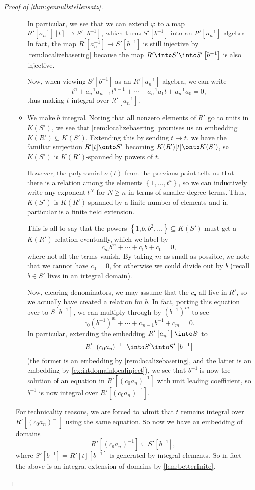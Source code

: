 \begin{proof}[Proof of \autoref{thm:gennullstellensatz}]
\begin{enumerate}[label=(\roman*)]
\begin{itemize}
			In particular, we see that we can extend $\varphi$ to a map $R'\left[a_n^{-1}\right][t]\to S'\left[b^{-1}\right]$, which turns $S'\left[b^{-1}\right]$ into an $R'\left[a_n^{-1}\right]$-algebra. In fact, the map $R'\left[a_n^{-1}\right]\to S'\left[b^{-1}\right]$ is still injective by \autoref{rem:localizebasering} because the map $R'\into S'\into S'\left[b^{-1}\right]$ is also injective.
			
			Now, when viewing $S'\left[b^{-1}\right]$ as an $R'\left[a_n^{-1}\right]$-algebra, we can write
			\[t^n+a_n^{-1}a_{n-1}t^{n-1}+\cdots+a_n^{-1}a_1t+a_n^{-1}a_0=0,\]
			thus making $t$ integral over $R'\left[a_n^{-1}\right]$.

			\item We make $b$ integral. Noting that all nonzero elements of $R'$ go to units in $K(S')$, we see that \autoref{rem:localizebasering} promises us an embedding $K(R')\subseteq K(S')$. Extending this by sending $t\mapsto t$, we have the familiar surjection $R'[t]\onto S'$ becoming $K(R')[t]\onto K(S')$, so $K(S')$ is $K(R')$-spanned by powers of $t$.
			
			However, the polynomial $a(t)$ from the previous point tells us that there is a relation among the elements $\left\{1,\ldots,t^n\right\}$, so we can inductively write any exponent $t^N$ for $N\ge n$ in terms of smaller-degree terms. Thus, $K(S')$ is $K(R')$-spanned by a finite number of elements and in particular is a finite field extension.

			This is all to say that the powers $\left\{1,b,b^2,\ldots\right\}\subseteq K(S')$ must get a $K(R')$-relation eventually, which we label by
			\[c_mb^m+\cdots+c_1b+c_0=0,\]
			where not all the terms vanish. By taking $m$ as small as possible, we note that we cannot have $c_0=0$, for otherwise we could divide out by $b$ (recall $b\in S'$ lives in an integral domain).
			
			Now, clearing denominators, we may assume that the $c_\bullet$ all live in $R'$, so we actually have created a relation for $b$. In fact, porting this equation over to $S\left[b^{-1}\right]$, we can multiply through by $\left(b^{-1}\right)^m$ to see
			\[c_0\left(b^{-1}\right)^m+\cdots+c_{m-1}b^{-1}+c_m=0.\]
			In particular, extending the embedding $R'\left[a_n^{-1}\right]\into S'$ to
			\[R'\left[(c_0a_n)^{-1}\right]\into S'\into S'\left[b^{-1}\right]\]
			(the former is an embedding by \autoref{rem:localizebasering}, and the latter is an embedding by \autoref{ex:intdomainlocalinject}), we see that $b^{-1}$ is now the solution of an equation in $R'\left[(c_0a_n)^{-1}\right]$ with unit leading coefficient, so $b^{-1}$ is now integral over $R'\left[(c_0a_n)^{-1}\right]$.
		\end{itemize}
		For technicality reasons, we are forced to admit that $t$ remains integral over $R'\left[(c_0a_n)^{-1}\right]$ using the same equation. So now we have an embedding of domains
		\[R'\left[(c_0a_n)^{-1}\right]\subseteq S'\left[b^{-1}\right],\]
		where $S'\left[b^{-1}\right]=R'[t]\left[b^{-1}\right]$ is generated by integral elements. So in fact the above is an integral extension of domains by \autoref{lem:betterfinite}.


\end{enumerate}
\end{proof}
